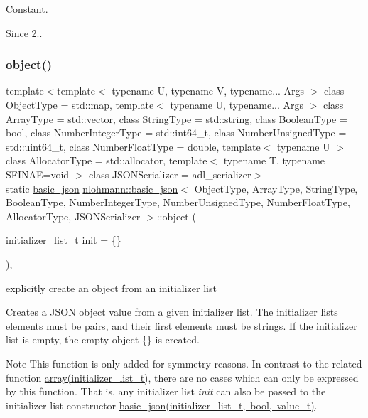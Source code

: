 Constant.

\begin{DoxySince}{Since}
2.. 
\end{DoxySince}
\mbox{\label{classnlohmann_1_1basic__json_aa13f7c0615867542ce80337cbcf13ada}} 
\subsubsection{\texorpdfstring{object()}{object()}}
{\footnotesize\ttfamily template$<$template$<$ typename U, typename V, typename... Args $>$ class Object\+Type = std\+::map, template$<$ typename U, typename... Args $>$ class Array\+Type = std\+::vector, class String\+Type  = std\+::string, class Boolean\+Type  = bool, class Number\+Integer\+Type  = std\+::int64\+\_\+t, class Number\+Unsigned\+Type  = std\+::uint64\+\_\+t, class Number\+Float\+Type  = double, template$<$ typename U $>$ class Allocator\+Type = std\+::allocator, template$<$ typename T, typename S\+F\+I\+N\+A\+E=void $>$ class J\+S\+O\+N\+Serializer = adl\+\_\+serializer$>$ \\
static \mbox{\hyperlink{classnlohmann_1_1basic__json}{basic\+\_\+json}} \mbox{\hyperlink{classnlohmann_1_1basic__json}{nlohmann\+::basic\+\_\+json}}$<$ Object\+Type, Array\+Type, String\+Type, Boolean\+Type, Number\+Integer\+Type, Number\+Unsigned\+Type, Number\+Float\+Type, Allocator\+Type, J\+S\+O\+N\+Serializer $>$\+::object (\begin{DoxyParamCaption}\item[{initializer\+\_\+list\+\_\+t}]{init = {\ttfamily \{\}} }\end{DoxyParamCaption})\hspace{0.3cm}{\ttfamily [inline]}, {\ttfamily [static]}}



explicitly create an object from an initializer list 

Creates a J\+S\+ON object value from a given initializer list. The initializer lists elements must be pairs, and their first elements must be strings. If the initializer list is empty, the empty object {\ttfamily \{\}} is created.

\begin{DoxyNote}{Note}
This function is only added for symmetry reasons. In contrast to the related function \mbox{\hyperlink{classnlohmann_1_1basic__json_aa80485befaffcadaa39965494e0b4d2e}{array(initializer\+\_\+list\+\_\+t)}}, there are no cases which can only be expressed by this function. That is, any initializer list {\itshape init} can also be passed to the initializer list constructor \mbox{\hyperlink{classnlohmann_1_1basic__json_ab5dfd9a2b2663b219641cb7fe59b6da2}{basic\+\_\+json(initializer\+\_\+list\+\_\+t, bool, value\+\_\+t)}}.
\end{DoxyNote}

